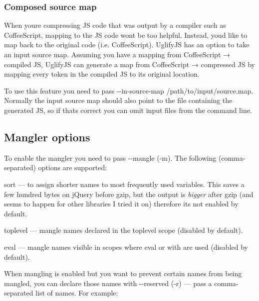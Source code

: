 \subsubsection*{Composed source map}

When you\textquotesingle{}re compressing J\+S code that was output by a compiler such as Coffee\+Script, mapping to the J\+S code won\textquotesingle{}t be too helpful. Instead, you\textquotesingle{}d like to map back to the original code (i.\+e. Coffee\+Script). Uglify\+J\+S has an option to take an input source map. Assuming you have a mapping from Coffee\+Script → compiled J\+S, Uglify\+J\+S can generate a map from Coffee\+Script → compressed J\+S by mapping every token in the compiled J\+S to its original location.

To use this feature you need to pass {\ttfamily -\/-\/in-\/source-\/map /path/to/input/source.map}. Normally the input source map should also point to the file containing the generated J\+S, so if that\textquotesingle{}s correct you can omit input files from the command line.

\subsection*{Mangler options}

To enable the mangler you need to pass {\ttfamily -\/-\/mangle} ({\ttfamily -\/m}). The following (comma-\/separated) options are supported\+:


\begin{DoxyItemize}
\item {\ttfamily sort} — to assign shorter names to most frequently used variables. This saves a few hundred bytes on j\+Query before gzip, but the output is {\itshape bigger} after gzip (and seems to happen for other libraries I tried it on) therefore it\textquotesingle{}s not enabled by default.
\item {\ttfamily toplevel} — mangle names declared in the toplevel scope (disabled by default).
\item {\ttfamily eval} — mangle names visible in scopes where {\ttfamily eval} or {\ttfamily with} are used (disabled by default).
\end{DoxyItemize}

When mangling is enabled but you want to prevent certain names from being mangled, you can declare those names with {\ttfamily -\/-\/reserved} ({\ttfamily -\/r}) — pass a comma-\/separated list of names. For example\+: 


